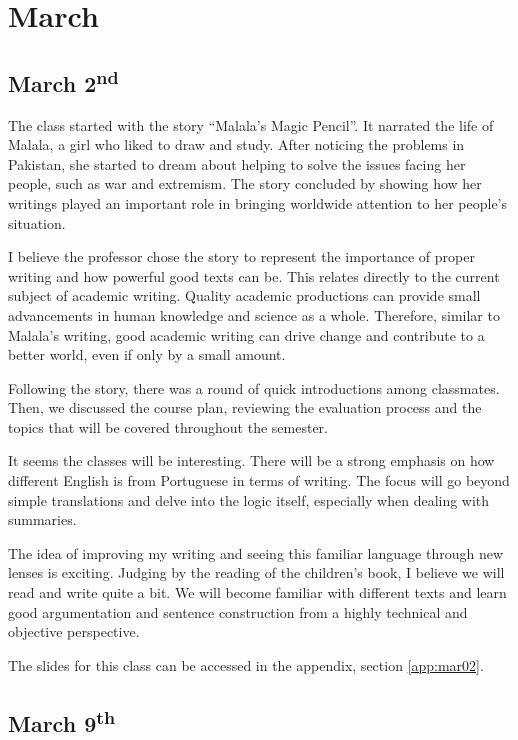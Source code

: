 \chapter{March}

\section[March 2nd]{March 2\textsuperscript{nd}}
The class started with the story ``Malala's Magic Pencil''. It narrated the life of Malala, a girl who liked to draw and study. After noticing the problems in Pakistan, she started to dream about helping to solve the issues facing her people, such as war and extremism. The story concluded by showing how her writings played an important role in bringing worldwide attention to her people's situation.

I believe the professor chose the story to represent the importance of proper writing and how powerful good texts can be. This relates directly to the current subject of academic writing. Quality academic productions can provide small advancements in human knowledge and science as a whole. Therefore, similar to Malala's writing, good academic writing can drive change and contribute to a better world, even if only by a small amount.

Following the story, there was a round of quick introductions among classmates. Then, we discussed the course plan, reviewing the evaluation process and the topics that will be covered throughout the semester.

It seems the classes will be interesting. There will be a strong emphasis on how different English is from Portuguese in terms of writing. The focus will go beyond simple translations and delve into the logic itself, especially when dealing with summaries.

The idea of improving my writing and seeing this familiar language through new lenses is exciting. Judging by the reading of the children's book, I believe we will read and write quite a bit. We will become familiar with different texts and learn good argumentation and sentence construction from a highly technical and objective perspective.

The slides for this class can be accessed in the appendix, section \ref{app:mar02}.

\section[March 9th]{March 9\textsuperscript{th}}

